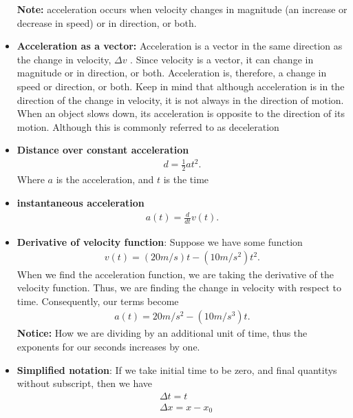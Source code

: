 \documentclass{report}
\begin{document}
\begin{itemize}
            \textbf{Note:} acceleration occurs when velocity changes in magnitude (an increase or decrease in speed) or in direction, or both.
               \item \textbf{Acceleration as a vector:} Acceleration is a vector in the same direction as the change in velocity,  $\Delta v$ . Since velocity is a vector, it can change in magnitude or in direction, or both. Acceleration is, therefore, a change in speed or direction, or both.
         \bigbreak \noindent 
         Keep in mind that although acceleration is in the direction of the change in velocity, it is not always in the direction of motion. When an object slows down, its acceleration is opposite to the direction of its motion. Although this is commonly referred to as deceleration
        \item \textbf{Distance over constant acceleration}
            \begin{align*}
                d = \frac{1}{2}at^{2} 
            .\end{align*}
            Where $a$ is the acceleration, and $t$ is the time
        \item \textbf{instantaneous acceleration}
            \begin{align*}
            a(t) = \frac{d}{dt}v(t)
            .\end{align*}
        \item \textbf{Derivative of velocity function}: Suppose we have some function 
            \begin{align*}
                v(t) = (20 m/s) t - (10 m/s^{2})t^{2}
            .\end{align*}
            When we find the acceleration function, we are taking the derivative of the velocity function. Thus, we are finding the change in velocity with respect to time. Consequently, our terms become
            \begin{align*}
                a(t) = 20 m/s^{2} - (10m/s^{3})t
            .\end{align*}
            \textbf{Notice:} How we are dividing by an additional unit of time, thus the exponents for our seconds increases by one.
        \item \textbf{Simplified notation}: If we take initial time to be zero, and final quantitys without subscript, then we have 
            \begin{align*}
               &\Delta t = t\\
                &\Delta x = x - x_{0}\\

\end{align*}
\end{itemize}
\end{document}
